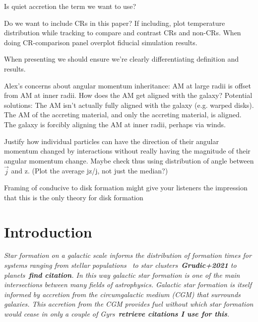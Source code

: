 \documentclass[fleqn,usenatbib]{mnras}
\begin{document}
Is quiet accretion the term we want to use?

Do we want to include CRs in this paper?
If including, plot temperature distribution while tracking to compare and contrast CRs and non-CRs.
When doing CR-comparison panel overplot fiducial simulation results.

When presenting we should ensure we're clearly differentiating definition and results.

Alex's concerns about angular momentum inheritance:
AM at large radii is offset from AM at inner radii.
How does the AM get aligned with the galaxy?
Potential solutions:
The AM isn't actually fully aligned with the galaxy (e.g. warped disks).
The AM of the accreting material, and only the accreting material, is aligned.
The galaxy is forcibly aligning the AM at inner radii, perhaps via winds.

Justify how individual particles can have the direction of their angular momentum changed by interactions without really having the magnitude of their angular momentum change.
Maybe check thus using distribution of angle between $\vec{j}$ and z. (Plot the average jz/j, not just the median?)

Framing of conducive to disk formation might give your listeners the impression that this is the only theory for disk formation

\section{Introduction}
\label{s: introduction}

\textit{
Star formation on a galactic scale informs the distribution of formation times for systems ranging from stellar populations~\cite{Yu2021} to star clusters~\textbf{Grudic+2021} to planets~\textbf{find citation}.
In this way galactic star formation is one of the main intersections between many fields of astrophysics.
Galactic star formation is itself informed by accretion from the circumgalactic medium (CGM) that surrounds galaxies.
This accretion from the CGM provides fuel without which star formation would cease in only a couple of Gyrs~\textbf{retrieve citations I use for this}.
}
\end{document}
